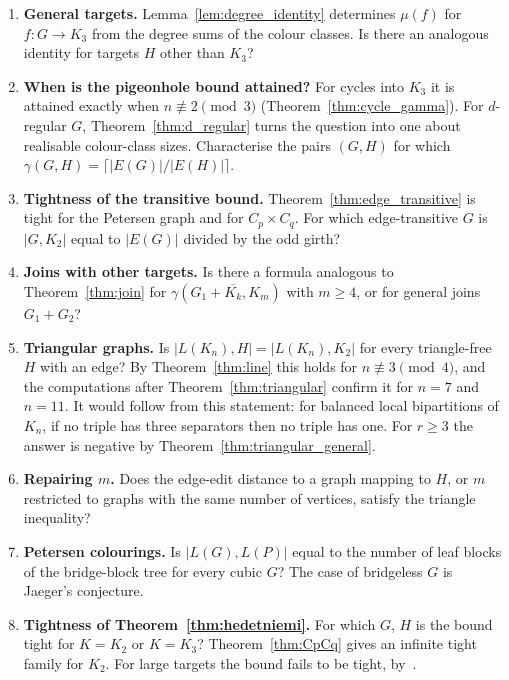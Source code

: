 \documentclass{article}
\theoremstyle{definition}
\begin{document}
\begin{enumerate}
\item \textbf{General targets.}  Lemma~\ref{lem:degree_identity} determines
$\mu(f)$ for $f\colon G\to K_3$ from the degree sums of the colour classes.  Is
there an analogous identity for targets $H$ other than $K_3$?

\item \textbf{When is the pigeonhole bound attained?}  For cycles into $K_3$ it
is attained exactly when $n\not\equiv2\pmod3$ (Theorem~\ref{thm:cycle_gamma}).
For $d$-regular $G$, Theorem~\ref{thm:d_regular} turns the question into one about
realisable colour-class sizes.  Characterise the pairs $(G,H)$ for which
$\gamma(G,H)=\lceil|E(G)|/|E(H)|\rceil$.

\item \textbf{Tightness of the transitive bound.}  Theorem~\ref{thm:edge_transitive}
is tight for the Petersen graph and for $C_p\times C_q$.  For which
edge-transitive $G$ is $|G,K_2|$ equal to $|E(G)|$ divided by the odd girth?

\item \textbf{Joins with other targets.}  Is there a formula analogous to
Theorem~\ref{thm:join} for $\gamma(G_1+\overline{K_k},K_m)$ with $m\ge4$, or for
general joins $G_1+G_2$?

\item \textbf{Triangular graphs.}  Is $|L(K_n),H|=|L(K_n),K_2|$ for every
triangle-free $H$ with an edge?  By Theorem~\ref{thm:line} this holds for
$n\not\equiv3\pmod4$, and the computations after Theorem~\ref{thm:triangular}
confirm it for $n=7$ and $n=11$.  It would follow from this statement: for balanced
local bipartitions of $K_n$, if no triple has three separators then no triple has
one.  For $r\ge3$ the answer is negative by Theorem~\ref{thm:triangular_general}.

\item \textbf{Repairing $m$.}  Does the edge-edit distance to a graph mapping to
$H$, or $m$ restricted to graphs with the same number of vertices, satisfy the
triangle inequality?

\item \textbf{Petersen colourings.}  Is $|L(G),L(P)|$ equal to the number of leaf
blocks of the bridge-block tree for every cubic $G$?  The case of bridgeless $G$
is Jaeger's conjecture.

\item \textbf{Tightness of Theorem~\ref{thm:hedetniemi}.}  For which $G$, $H$ is
the bound tight for $K=K_2$ or $K=K_3$?  Theorem~\ref{thm:CpCq} gives an
infinite tight family for $K_2$.  For large targets the bound fails to be tight,
by~\cite{shitov2019}.
\end{enumerate}
\end{document}
